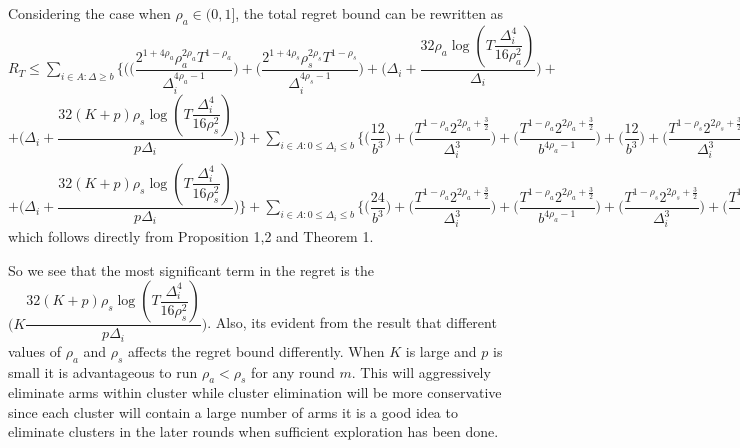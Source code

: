 \begin{remark}
Considering the case when $\rho_{a}\in (0,1]$, the total regret bound can be rewritten as $R_{T}\leq \sum_{i\in A:\Delta\geq b} \bigg\lbrace \bigg(\bigg(\dfrac{2^{1+4\rho_{a}}\rho_{a}^{2\rho_{a}}T^{1-\rho_{a}}}{\Delta_{i}^{4\rho_{a}-1}}\bigg) + \bigg(\dfrac{2^{1+4\rho_{s}}\rho_{s}^{2\rho_{s}}T^{1-\rho_{s}}}{\Delta_{i}^{4\rho_{s}-1}}\bigg) + \bigg(\Delta_{i}+\dfrac{32\rho_{a}\log{(T\dfrac{\Delta_{i}^{4}}{16\rho_{a}^{2}})}}{\Delta_{i}}\bigg) +$ \newline $ + \bigg(\Delta_{i}+\dfrac{32(K+p)\rho_{s}\log{(T\dfrac{\Delta_{i}^{4}}{16\rho_{s}^{2}})}}{p\Delta_{i}}\bigg)\bigg\rbrace + \sum_{i\in A:0\leq\Delta_{i}\leq b}\bigg\lbrace \bigg(\dfrac{12}{b^{3}} \bigg) + \bigg(\dfrac{T^{1-\rho_{a}}2^{2\rho_{a}+\frac{3}{2}}}{\Delta_{i}^{3}} \bigg)+\bigg(\dfrac{T^{1-\rho_{a}}2^{2\rho_{a}+\frac{3}{2}}}{b^{4\rho_{a} -1}} \bigg) + \bigg(\dfrac{12}{b^{3}} \bigg) + \bigg(\dfrac{T^{1-\rho_{s}}2^{2\rho_{s}+\frac{3}{2}}}{\Delta_{i}^{3}} \bigg)+\bigg(\dfrac{T^{1-\rho_{s}}2^{2\rho_{s}+\frac{3}{2}}}{b^{4\rho_{s} -1}} \bigg) \bigg\rbrace + max_{i:\Delta\leq b}\Delta_{i}T   =    \sum_{i\in A:\Delta\geq b} \bigg\lbrace \bigg(\bigg(\dfrac{2^{1+4\rho_{a}}\rho_{a}^{2\rho_{a}}T^{1-\rho_{a}}}{\Delta_{i}^{4\rho_{a}-1}}\bigg) + \bigg(\dfrac{2^{1+4\rho_{s}}\rho_{s}^{2\rho_{s}}T^{1-\rho_{s}}}{\Delta_{i}^{4\rho_{s}-1}}\bigg) + \bigg(\Delta_{i}+\dfrac{32\rho_{a}\log{(T\dfrac{\Delta_{i}^{4}}{16\rho_{a}^{2}})}}{\Delta_{i}}\bigg) +$ \newline $ + \bigg(\Delta_{i}+\dfrac{32(K+p)\rho_{s}\log{(T\dfrac{\Delta_{i}^{4}}{16\rho_{s}^{2}})}}{p\Delta_{i}}\bigg)\bigg\rbrace + \sum_{i\in A:0\leq\Delta_{i}\leq b}\bigg\lbrace \bigg(\dfrac{24}{b^{3}} \bigg) + \bigg(\dfrac{T^{1-\rho_{a}}2^{2\rho_{a}+\frac{3}{2}}}{\Delta_{i}^{3}} \bigg)+\bigg(\dfrac{T^{1-\rho_{a}}2^{2\rho_{a}+\frac{3}{2}}}{b^{4\rho_{a} -1}} \bigg) + \bigg(\dfrac{T^{1-\rho_{s}}2^{2\rho_{s}+\frac{3}{2}}}{\Delta_{i}^{3}} \bigg)+\bigg(\dfrac{T^{1-\rho_{s}}2^{2\rho_{s}+\frac{3}{2}}}{b^{4\rho_{s} -1}} \bigg) \bigg\rbrace + max_{i:\Delta\leq b}\Delta_{i}T $ which follows directly from Proposition 1,2 and Theorem 1.

	So we see that the most significant term in the regret is the $\bigg(K\dfrac{32(K+p)\rho_{s}\log{(T\dfrac{\Delta_{i}^{4}}{16\rho_{s}^{2}})}}{p\Delta_{i}}\bigg)$. Also, its evident from the result that different values of $\rho_{a}$ and $\rho_{s}$ affects the regret bound differently. When $K$ is large and $p$ is small it is advantageous to run $\rho_{a}< \rho_{s}$ for any round $m$. This will aggressively eliminate arms within cluster while cluster elimination will be more conservative since each cluster will contain a large number of arms it is a good idea to eliminate clusters in the later rounds when sufficient exploration has been done.
	
\end{remark}

